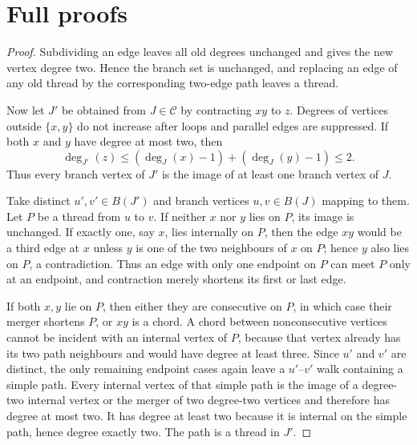 \documentclass[11pt,a4paper]{article}
\theoremstyle{plain}
\theoremstyle{definition}
\theoremstyle{remark}
\newcommand{\cC}{\mathcal C}
\begin{document}
\appendix

\section{Full proofs}\label{app:proofs}

\label{pf:closure}
\lemclosure*
\begin{proof}
Subdividing an edge leaves all old degrees unchanged and gives the new vertex degree two. Hence the branch set is unchanged, and replacing an edge of any old thread by the corresponding two-edge path leaves a thread.

Now let $J'\!$ be obtained from $J\in\cC$ by contracting $xy$ to $z$. Degrees of vertices outside $\{x,y\}$ do not increase after loops and parallel edges are suppressed. If both $x$ and $y$ have degree at most two, then
\[
 \deg_{J'}(z)\le(\deg_J(x)-1)+(\deg_J(y)-1)\le2.
\]
Thus every branch vertex of $J'$ is the image of at least one branch vertex of $J$.

Take distinct $u',v'\in B(J')$ and branch vertices $u,v\in B(J)$ mapping to them. Let $P$ be a thread from $u$ to $v$. If neither $x$ nor $y$ lies on $P$, its image is unchanged. If exactly one, say $x$, lies internally on $P$, then the edge $xy$ would be a third edge at $x$ unless $y$ is one of the two neighbours of $x$ on $P$; hence $y$ also lies on $P$, a contradiction. Thus an edge with only one endpoint on $P$ can meet $P$ only at an endpoint, and contraction merely shortens its first or last edge.

If both $x,y$ lie on $P$, then either they are consecutive on $P$, in which case their merger shortens $P$, or $xy$ is a chord. A chord between nonconsecutive vertices cannot be incident with an internal vertex of $P$, because that vertex already has its two path neighbours and would have degree at least three. Since $u'$ and $v'$ are distinct, the only remaining endpoint cases again leave a $u'$--$v'$ walk containing a simple path. Every internal vertex of that simple path is the image of a degree-two internal vertex or the merger of two degree-two vertices and therefore has degree at most two. It has degree at least two because it is internal on the simple path, hence degree exactly two. The path is a thread in $J'$.
\end{proof}
\end{document}
